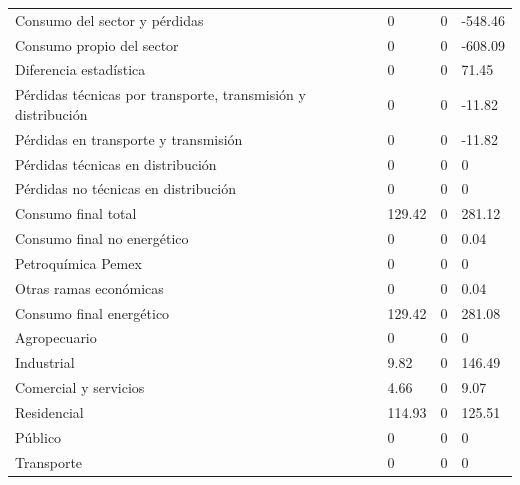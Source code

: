 \documentclass{sener2025}
\begin{document}
\begin{tabladoradoLargo}
\begin{xltabular}{\textwidth}{YZZZ}
    Consumo del sector y pérdidas & 0 & 0 & -548.46 \\
    \hspace{1.35em} Consumo propio del sector & 0 & 0 & -608.09 \\
    \hspace{1.35em} Diferencia estadística & 0 & 0 & 71.45 \\
    \hspace{1.35em} Pérdidas técnicas por transporte, transmisión y distribución & 0 & 0 & -11.82 \\
    \hspace{2.7em} Pérdidas en transporte y transmisión & 0 & 0 & -11.82 \\
    \hspace{2.7em} Pérdidas técnicas en distribución & 0 & 0 & 0 \\
    \hspace{2.7em} Pérdidas no técnicas  en distribución & 0 & 0 & 0 \\
    Consumo final total & 129.42 & 0 & 281.12 \\
    \hspace{1.35em} Consumo final no energético & 0 & 0 & 0.04 \\
    \hspace{2.7em} Petroquímica Pemex & 0 & 0 & 0 \\
    \hspace{2.7em} Otras ramas económicas & 0 & 0 & 0.04 \\
    Consumo final energético & 129.42 & 0 & 281.08 \\
    \hspace{2.7em} Agropecuario & 0 & 0 & 0 \\
    \hspace{2.7em} Industrial & 9.82 & 0 & 146.49 \\
    \hspace{2.7em} Comercial y servicios & 4.66 & 0 & 9.07 \\
    \hspace{2.7em} Residencial & 114.93 & 0 & 125.51 \\
    \hspace{2.7em} Público & 0 & 0 & 0 \\
    \hspace{2.7em} Transporte & 0 & 0 & 0 \\
  \end{xltabular}
\end{tabladoradoLargo}
\vspace{-4pt}
\end{document}
